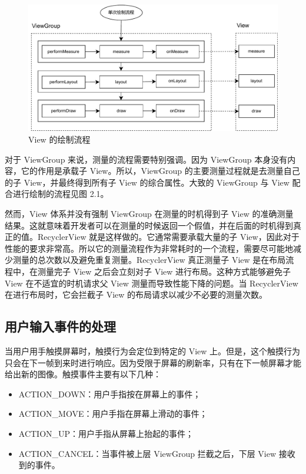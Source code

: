 \begin{figure}
    \centering
    \begin{adjustbox}{max width=\textwidth}
        \includegraphics{assets/view-measure-layout-draw.pdf}
    \end{adjustbox}
    \caption{View 的绘制流程}
\end{figure}

对于 ViewGroup 来说，测量的流程需要特别强调。因为 ViewGroup 本身没有内容，它的作用是承载子 View。所以，ViewGroup 的主要测量过程就是去测量自己的子 View，并最终得到所有子 View 的综合属性。大致的 ViewGroup 与 View 配合进行绘制的流程见图 2.1。

然而，View 体系并没有强制 ViewGroup 在测量的时机得到子 View 的准确测量结果。这就意味着开发者可以在测量的时候返回一个假值，并在后面的时机得到真正的值。RecyclerView 就是这样做的。它通常需要承载大量的子 View，因此对于性能的要求非常高。所以它的测量流程作为非常耗时的一个流程，需要尽可能地减少测量的总次数以及避免重复测量。RecyclerView 真正测量子 View 是在布局流程中，在测量完子 View 之后会立刻对子 View 进行布局。这种方式能够避免子 View 在不适宜的时机请求父 View 测量而导致性能下降的问题。当 RecyclerView 在进行布局时，它会拦截子 View 的布局请求以减少不必要的测量次数。

\subsection{用户输入事件的处理}

当用户用手触摸屏幕时，触摸行为会定位到特定的 View 上。但是，这个触摸行为只会在下一帧到来时进行响应。因为受限于屏幕的刷新率，只有在下一帧屏幕才能给出新的图像。触摸事件主要有以下几种：


\begin{itemize}
    \item ACTION\_DOWN：用户手指按在屏幕上的事件；
    \item ACTION\_MOVE：用户手指在屏幕上滑动的事件；
    \item ACTION\_UP：用户手指从屏幕上抬起的事件；
    \item ACTION\_CANCEL：当事件被上层 ViewGroup 拦截之后，下层 View 接收到的事件。
\end{itemize}


